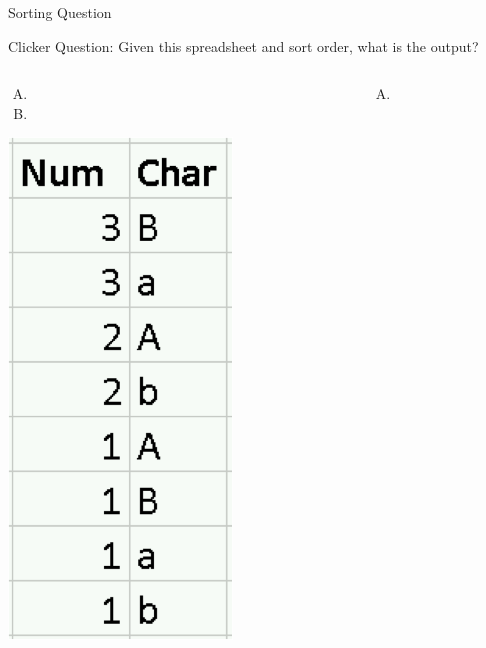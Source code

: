 \documentclass[xcolor=svgnames]{beamer}
\begin{document}
\begin{frame}{Sorting Question}
\begin{exampleblock}{Clicker Question:} Given this spreadsheet and sort order, what is the output?
\end{exampleblock}
\begin{columns}[T] %
\begin{column}{.33\textwidth}
\vspace{-1em}
\begin{enumerate}[A)]
\item 
\item[]
\end{enumerate}
\vspace{-1em}
 \includegraphics[height=.6\textheight]{sortA}
\end{column}%
\hfill%
\begin{column}{.33\textwidth}
\vspace{-1em}
\begin{enumerate}[B)]
\item 
\end{enumerate}

\end{column}
\end{columns}
\end{frame}
\end{document}

